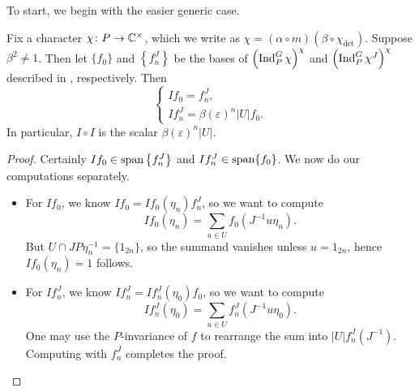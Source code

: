To start, we begin with the easier generic case.
\begin{proposition} \label{prop:generic-intertwining}
	Fix a character $\chi\colon P\to\mathbb C^\times$, which we write as $\chi=(\alpha\circ m)(\beta\circ\chi_{\det})$. Suppose $\beta^2\ne1$. Then let $\{f_0\}$ and $\left\{f_n^J\right\}$ be the bases of $\left(\operatorname{Ind}_P^G\chi\right)^\chi$ and $\left(\operatorname{Ind}_P^G\chi^J\right)^\chi$ described in , respectively. Then
    \[\begin{cases}
        If_0=f_n^J, \\
        If_n^J=\beta(\varepsilon)^n\left|U\right|f_0.
    \end{cases}\]
	In particular, $I\circ I$ is the scalar $\beta(\varepsilon)^n\left|U\right|$.
\end{proposition}
\begin{proof}
	Certainly $If_0\in\operatorname{span}\left\{f_n^J\right\}$ and $If_n^J\in\operatorname{span}\{f_0\}$. We now do our computations separately.
    \begin{itemize}
        \item For $If_0$, we know $If_0=If_0(\eta_n)f_n^J$, so we want to compute
    	\[If_0(\eta_n)=\sum_{u\in U}f_0\left(J^{-1}u\eta_n\right).\]
        But $U\cap JP\eta_n^{-1}=\{1_{2n}\}$, so the summand vanishes unless $u=1_{2n}$, hence $If_0(\eta_n)=1$ follows.
        \item For $If_n^J$, we know $If_n^J=If_n^J(\eta_0)f_0$, so we want to compute
    	\[If_n^J(\eta_0)=\sum_{u\in U}f_n^J\left(J^{-1}u\eta_0\right).\]
        One may use the $P$-invariance of $f$ to rearrange the sum into $\left|U\right|f_n^J\left(J^{-1}\right)$. Computing with $f_n^J$ completes the proof.
        \qedhere
    \end{itemize}
\end{proof}
